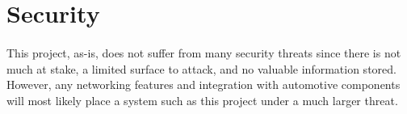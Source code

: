 \section{Security}

\paragraph{}
This project, as-is, does not suffer from many security threats since there is not much at stake, a limited surface to attack, and no valuable information stored.
However, any networking features and integration with automotive components will most likely place a system such as this project under a much larger threat.
